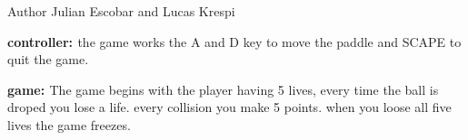 \begin{DoxyAuthor}{Author}
Julian Escobar and Lucas Krespi
\end{DoxyAuthor}
{\bfseries{controller\+: }}  the game works the \textquotesingle{}A\textquotesingle{} and \textquotesingle{}D\textquotesingle{} key to move the paddle and \textquotesingle{}SCAPE\textquotesingle{} to quit the game. 

{\bfseries{game\+: }}  The game begins with the player having 5 lives, every time the ball is droped you lose a life. every collision you make 5 points. when you loose all five lives the game freezes.  